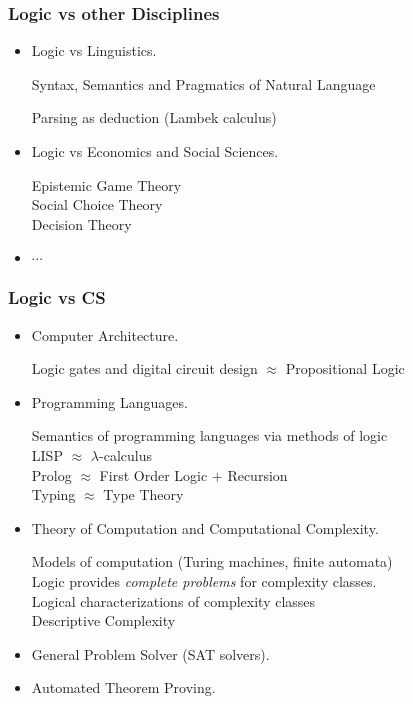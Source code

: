 \documentclass[UTF8,aspectratio=43,11pt,colorlinks,compress,openany]{beamer}%
\begin{document}
\begin{frame}\frametitle{Logic vs other Disciplines}
	\begin{itemize}
		\item Logic vs Linguistics.

		Syntax, Semantics and Pragmatics of Natural Language

		Parsing as deduction (Lambek calculus)
		\item Logic vs Economics and Social Sciences.

		Epistemic Game Theory\\
		Social Choice Theory\\
		Decision Theory
		\item $\cdots$
	\end{itemize}
\end{frame}

\begin{frame}\frametitle{Logic vs CS}
	\begin{itemize}
		\item Computer Architecture.
		
		Logic gates and digital circuit design $\approx$ Propositional Logic
		\item Programming Languages.
		
		Semantics of programming languages via methods of logic\\
		LISP $\approx$ $\lambda$-calculus\\
		Prolog $\approx$ First Order Logic $+$ Recursion\\
		Typing $\approx$ Type Theory
		\item Theory of Computation and Computational Complexity.
		
		Models of computation (Turing machines, finite automata)\\
		Logic provides \emph{complete problems} for complexity classes.\\
		Logical characterizations of complexity classes\\
		Descriptive Complexity
		\item General Problem Solver (SAT solvers).
		\item Automated Theorem Proving.
	\end{itemize}
\end{frame}
\end{document}

